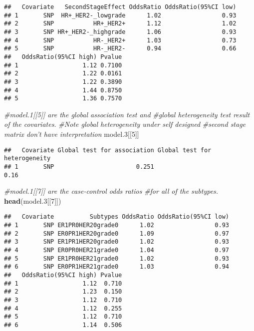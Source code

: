 \documentclass[11pt,]{article}
\newenvironment{Shaded}{\begin{snugshade}}{\end{snugshade}}
\newcommand{\KeywordTok}[1]{\textcolor[rgb]{0.13,0.29,0.53}{\textbf{#1}}}
\newcommand{\DecValTok}[1]{\textcolor[rgb]{0.00,0.00,0.81}{#1}}
\newcommand{\CommentTok}[1]{\textcolor[rgb]{0.56,0.35,0.01}{\textit{#1}}}
\newcommand{\NormalTok}[1]{#1}
\begin{document}
\begin{verbatim}
##   Covariate   SecondStageEffect OddsRatio OddsRatio(95%CI low)
## 1       SNP  HR+_HER2-_lowgrade      1.02                 0.93
## 2       SNP           HR+_HER2+      1.12                 1.02
## 3       SNP HR+_HER2-_highgrade      1.06                 0.93
## 4       SNP           HR-_HER2+      1.03                 0.73
## 5       SNP           HR-_HER2-      0.94                 0.66
##   OddsRatio(95%CI high) Pvalue
## 1                  1.12 0.7100
## 2                  1.22 0.0161
## 3                  1.22 0.3890
## 4                  1.44 0.8750
## 5                  1.36 0.7570
\end{verbatim}

\begin{Shaded}
\begin{Highlighting}[]
\CommentTok{#model.1[[5]] are the global association test and }
\CommentTok{#global heterogeneity test result of the covariates.}
\CommentTok{#Note global heterogeneity under self designed}
\CommentTok{#second stage matrix don't have interpretation}
\NormalTok{model.}\DecValTok{3}\NormalTok{[[}\DecValTok{5}\NormalTok{]]}
\end{Highlighting}
\end{Shaded}

\begin{verbatim}
##   Covariate Global test for association Global test for heterogeneity
## 1       SNP                       0.251                          0.16
\end{verbatim}

\begin{Shaded}
\begin{Highlighting}[]
\CommentTok{#model.1[[7]] are the case-control odds ratios }
\CommentTok{#for all of the subtypes.}
\KeywordTok{head}\NormalTok{(model.}\DecValTok{3}\NormalTok{[[}\DecValTok{7}\NormalTok{]])}
\end{Highlighting}
\end{Shaded}

\begin{verbatim}
##   Covariate          Subtypes OddsRatio OddsRatio(95%CI low)
## 1       SNP ER1PR0HER20grade0      1.02                 0.93
## 2       SNP ER0PR1HER20grade0      1.09                 0.97
## 3       SNP ER1PR1HER20grade0      1.02                 0.93
## 4       SNP ER0PR0HER21grade0      1.04                 0.97
## 5       SNP ER1PR0HER21grade0      1.02                 0.93
## 6       SNP ER0PR1HER21grade0      1.03                 0.94
##   OddsRatio(95%CI high) Pvalue
## 1                  1.12  0.710
## 2                  1.23  0.150
## 3                  1.12  0.710
## 4                  1.12  0.255
## 5                  1.12  0.710
## 6                  1.14  0.506
\end{verbatim}
\end{document}
